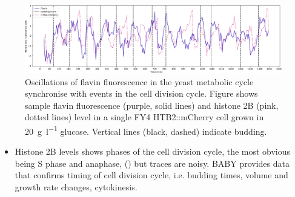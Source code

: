 \begin{figure}
  \centering
    \includegraphics[width=1.0\linewidth]{single_birth_plot_edit.pdf}
    \caption{
      Oscillations of flavin fluorescence in the yeast metabolic cycle synchronise with events in the cell division cycle.
      Figure shows sample flavin fluorescence (purple, solid lines) and histone 2B (pink, dotted lines) level in a single FY4 HTB2::mCherry cell grown in \SI{20}{\gram~\litre^{-1}} glucose.
      Vertical lines (black, dashed) indicate budding.
    }
  \label{fig:biology-highglc-single}
\end{figure}

\begin{itemize}
\item Histone 2B levels shows phases of the cell division cycle, the most obvious being S phase and anaphase, (\textcite{garmendia-torresMultipleInputsEnsure2018}) but traces are noisy.  BABY provides data that confirms timing of cell division cycle, i.e. budding times, volume and growth rate changes, cytokinesis.
\end{itemize}

